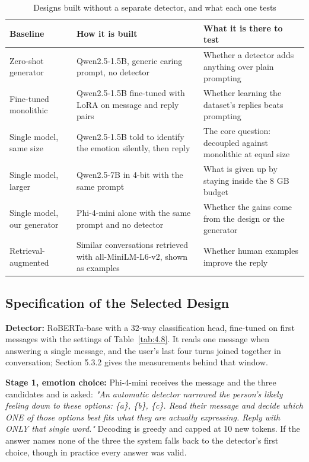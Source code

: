 \begin{table}[H]
\centering
\footnotesize
\begin{tabularx}{\textwidth}{@{}lXX@{}}
\toprule
\textbf{Baseline} & \textbf{How it is built} & \textbf{What it is there to test} \\
\midrule
Zero-shot generator & Qwen2.5-1.5B, generic caring prompt, no detector & Whether a detector adds anything over plain prompting \\
Fine-tuned monolithic & Qwen2.5-1.5B fine-tuned with LoRA on message and reply pairs & Whether learning the dataset's replies beats prompting \\
Single model, same size & Qwen2.5-1.5B told to identify the emotion silently, then reply & The core question: decoupled against monolithic at equal size \\
Single model, larger & Qwen2.5-7B in 4-bit with the same prompt & What is given up by staying inside the 8 GB budget \\
Single model, our generator & Phi-4-mini alone with the same prompt and no detector & Whether the gains come from the design or the generator \\
Retrieval-augmented & Similar conversations retrieved with all-MiniLM-L6-v2, shown as examples & Whether human examples improve the reply \\
\bottomrule
\end{tabularx}
\caption{Designs built without a separate detector, and what each one tests}
\label{tab:4.5}
\end{table}

\subsection{Specification of the Selected Design}

\textbf{Detector:} RoBERTa-base with a 32-way classification head, fine-tuned on first messages with the settings of Table~\ref{tab:4.8}. It reads one message when answering a single message, and the user's last four turns joined together in conversation; Section 5.3.2 gives the measurements behind that window.

\textbf{Stage 1, emotion choice: }Phi-4-mini receives the message and the three candidates and is asked:\textit{ "An automatic detector narrowed the person's likely feeling down to these options: \{a\}, \{b\}, \{c\}. Read their message and decide which ONE of those options best fits what they are actually expressing. Reply with ONLY that single word."} Decoding is greedy and capped at 10 new tokens. If the answer names none of the three the system falls back to the detector's first choice, though in practice every answer was valid.

